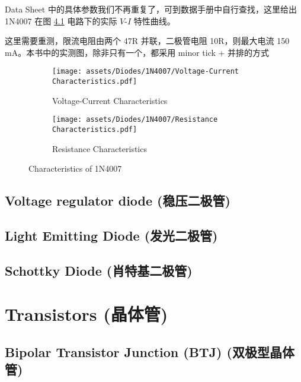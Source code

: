 \documentclass[UTF8]{report}
\begin{document}
Data Sheet 中的具体参数我们不再重复了，可到数据手册中自行查找，这里给出 1N4007 在图 \ref{} 电路下的实际 $V$-$I$ 特性曲线。

\begin{center}
    {\color{red} 这里需要重测，限流电阻由两个 47R 并联，二极管电阻 10R，则最大电流 150 mA。本书中的实测图，除非只有一个，都采用 minor tick + 并排的方式}
\end{center}

\begin{figure}[H]\centering
\begin{subfigure}[b]{0.52\columnwidth}\centering
    \texttt{[image: assets/Diodes/1N4007/Voltage-Current Characteristics.pdf]}
    \caption{Voltage-Current Characteristics}
\end{subfigure}\hfill
\begin{subfigure}[b]{0.48\columnwidth}\centering
    \texttt{[image: assets/Diodes/1N4007/Resistance Characteristics.pdf]}
    \caption{Resistance Characteristics}
\end{subfigure}
\caption{Characteristics of 1N4007}
\end{figure}

\subsection{}






\section{Voltage regulator diode (稳压二极管)}
\section{Light Emitting Diode (发光二极管)}
\section{Schottky Diode (肖特基二极管)}

\chapter{Transistors (晶体管)}\thispagestyle{fancy}
\section{Bipolar Transistor Junction (BTJ) (双极型晶体管)}
\end{document}

